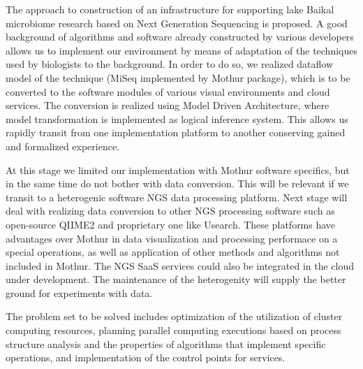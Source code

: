 \documentclass[a4paper]{jpconf}
\begin{document}
The approach to construction of an infrastructure for supporting lake Baikal microbiome research based on Next Generation Sequencing is proposed. A good background of algorithms and software already constructed by various developers allows us to implement our environment by means of adaptation of the techniques used by biologists to the background.  In order to do so, we realized dataflow model of the technique (MiSeq implemented by Mothur package), which is to be converted to the software modules of various visual environments and cloud services.  The conversion is realized using Model Driven Architecture, where model transformation is implemented as logical inference system. This allows us rapidly transit from one implementation platform to another conserving gained and formalized experience.

At this stage we limited our implementation with Mothur software specifics, but in the same time do not bother with data conversion.  This will be relevant if we transit to a heterogenic software NGS data processing platform.  Next stage will deal with realizing data conversion to other NGS processing software such as open-source QIIME2 and proprietary one like Usearch.  These platforms have advantages over Mothur in data visualization and processing performace on a special operations, as well as application of other methods and algorithms not included in Mothur. The NGS SaaS services \cite{guo16,kwon15} could also be integrated in the cloud under development.  The maintenance of the heterogenity will supply the better ground for experiments with data.

The problem set to be solved includes optimization of the utilization of cluster computing resources, planning parallel computing executions based on process structure analysis and the properties of algorithms that implement specific operations, and implementation of the control points for services.




\end{document}
